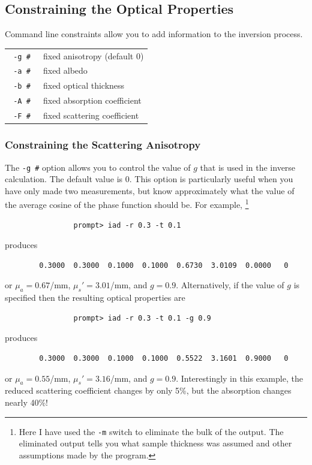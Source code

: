 \documentclass{article}
\begin{document}
\subsection{Constraining the Optical Properties}

Command line constraints allow you to add information to the inversion 
process.

\begin{center}
\begin{tabular}{lp{7cm}}
\texttt{ -g \#               }& fixed anisotropy (default 0)               \\
\texttt{ -a \#               }& fixed albedo                               \\
\texttt{ -b \#               }& fixed optical thickness                    \\
\texttt{ -A \#               }& fixed absorption coefficient               \\
\texttt{ -F \#               }& fixed scattering coefficient               \\[3mm]
\end{tabular}
\end{center}

\subsubsection{Constraining the Scattering Anisotropy}

The \texttt{-g \#} option allows you to control the value of $g$ that is used in the inverse
calculation.  The default value is 0.  This option is particularly useful when you have only made two measurements,
but know approximately what the value of the average cosine of the phase function 
should be.  For example,%
\footnote{Here I have used the \texttt{-m} switch to eliminate the bulk
of the output.  The eliminated output tells you what sample thickness was assumed and other 
assumptions made by the program.}
\begin{verbatim}
                prompt> iad -r 0.3 -t 0.1
\end{verbatim}
produces
\begin{verbatim}
        0.3000  0.3000  0.1000  0.1000  0.6730  3.0109  0.0000   0
\end{verbatim}
or $\mu_a=0.67$/mm, $\mu_s'=3.01$/mm, and $g=0.9$.  Alternatively, if the
value of $g$ is specified then the resulting optical properties are 
\begin{verbatim}
                prompt> iad -r 0.3 -t 0.1 -g 0.9
\end{verbatim}
produces
\begin{verbatim}
        0.3000  0.3000  0.1000  0.1000  0.5522  3.1601  0.9000   0
\end{verbatim}
or $\mu_a=0.55$/mm, $\mu_s'=3.16$/mm, and $g=0.9$.  Interestingly in this
example, the reduced scattering coefficient changes by only 5\%, but the
absorption changes nearly 40\%!
\end{document}

